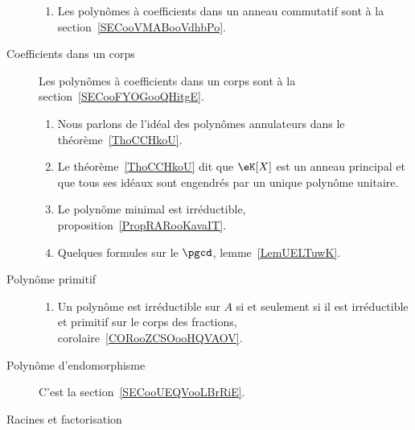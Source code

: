 \begin{description}
	      \begin{enumerate}
		      \item
		            Les polynômes à coefficients dans un anneau commutatif  sont à la section~\ref{SECooVMABooVdhbPo}.
	      \end{enumerate}


	\item[Coefficients dans un corps]
	      Les polynômes à coefficients dans un corps sont à la section~\ref{SECooFYOGooQHitgE}.
	      \begin{enumerate}

		      \item
		            Nous parlons de l'idéal des polynômes annulateurs dans le théorème~\ref{ThoCCHkoU}.
		      \item
		            Le théorème~\ref{ThoCCHkoU} dit que \( \eK[X]\) est un anneau principal et que tous ses idéaux sont engendrés par un unique polynôme unitaire.
		      \item
		            Le polynôme minimal est irréductible, proposition~\ref{PropRARooKavaIT}.
		      \item
		            Quelques formules sur le \( \pgcd\), lemme~\ref{LemUELTuwK}.
	      \end{enumerate}
	\item[Polynôme primitif]

	      \begin{enumerate}
		      \item
		            Un polynôme est irréductible sur \( A\) si et seulement si il est irréductible et primitif sur le corps des fractions, corolaire~\ref{CORooZCSOooHQVAOV}.
	      \end{enumerate}

	\item[Polynôme d'endomorphisme]
	      C'est la section~\ref{SECooUEQVooLBrRiE}.

	\item[Racines et factorisation]


\end{description}
